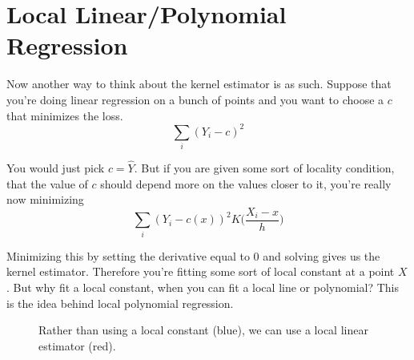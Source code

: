 \section{Local Linear/Polynomial Regression}

  Now another way to think about the kernel estimator is as such. Suppose that you're doing linear regression on a bunch of points and you want to choose a $c$ that minimizes the loss. 
  \begin{equation}
    \sum_i (Y_i - c)^2
  \end{equation}

  You would just pick $c = \hat{Y}$. But if you are given some sort of locality condition, that the value of $c$ should depend more on the values closer to it, you're really now minimizing 
  \begin{equation}
    \sum_i (Y_i - c(x))^2 K \bigg( \frac{X_i - x}{h} \bigg)
  \end{equation}

  Minimizing this by setting the derivative equal to $0$ and solving gives us the kernel estimator. Therefore you're fitting some sort of local constant at a point $X$. But why fit a local constant, when you can fit a local line or polynomial? This is the idea behind local polynomial regression.

  \begin{figure}[H]
    \centering 
    \caption{Rather than using a local constant (blue), we can use a local linear estimator (red).} 
    \label{fig:local_linear_estimator}
  \end{figure}

